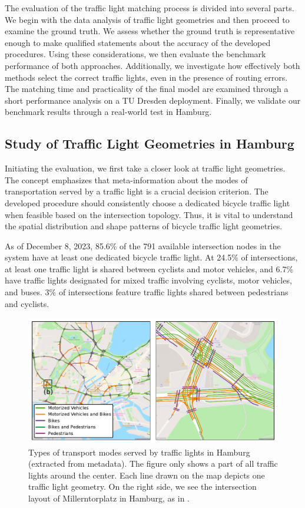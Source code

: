 The evaluation of the traffic light matching process is divided into several parts. We begin with the data analysis of traffic light geometries and then proceed to examine the ground truth. We assess whether the ground truth is representative enough to make qualified statements about the accuracy of the developed procedures. Using these considerations, we then evaluate the benchmark performance of both approaches. Additionally, we investigate how effectively both methods select the correct traffic lights, even in the presence of routing errors. The matching time and practicality of the final model are examined through a short performance analysis on a TU Dresden deployment. Finally, we validate our benchmark results through a real-world test in Hamburg.

\subsection{Study of Traffic Light Geometries in Hamburg}

Initiating the evaluation, we first take a closer look at traffic light geometries. The concept emphasizes that meta-information about the modes of transportation served by a traffic light is a crucial decision criterion. The developed procedure should consistently choose a dedicated bicycle traffic light when feasible based on the intersection topology. Thus, it is vital to understand the spatial distribution and shape patterns of bicycle traffic light geometries.

As of December 8, 2023, 85.6\% of the 791 available intersection nodes in the system have at least one dedicated bicycle traffic light. At 24.5\% of intersections, at least one traffic light is shared between cyclists and motor vehicles, and 6.7\% have traffic lights designated for mixed traffic involving cyclists, motor vehicles, and buses. 3\% of intersections feature traffic lights shared between pedestrians and cyclists.

\begin{figure}[t]
\centering
\includegraphics[width=\linewidth]{images/lanes-map.pdf}
\caption{Types of transport modes served by traffic lights in Hamburg (extracted from metadata). The figure only shows a part of all traffic lights around the center. Each line drawn on the map depicts one traffic light geometry. On the right side, we see the intersection layout of Millerntorplatz in Hamburg, as in .}
\label{fig:lanes-map}
\end{figure}

